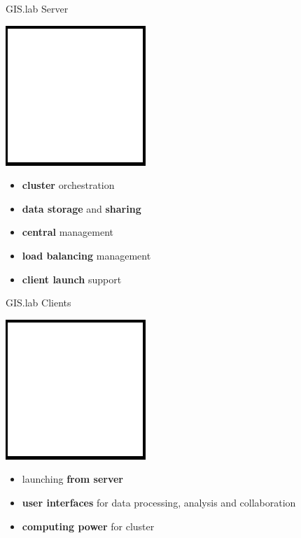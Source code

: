 \documentclass[12pt]{beamer}
\begin{document}
\begin{frame}{GIS.lab Server}
	\begin{center}
		\includegraphics[keepaspectratio=true,height=0.3\textheight]{images/image.png}
	\end{center}
	\begin{itemize}
		\item \textbf{cluster} orchestration
		\item \textbf{data storage} and \textbf{sharing}
		\item \textbf{central} management
		\item \textbf{load balancing} management
		\item \textbf{client launch} support
	\end{itemize}
\end{frame}

\begin{frame}{GIS.lab Clients}
	\begin{center}
		\includegraphics[keepaspectratio=true,height=0.3\textheight]{images/image.png}
	\end{center}
	\begin{itemize}
		\item launching \textbf{from server}
		\item \textbf{user interfaces} for data processing, analysis and collaboration
		\item \textbf{computing power} for cluster
	\end{itemize}
\end{frame}
\end{document}
